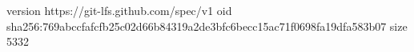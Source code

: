 version https://git-lfs.github.com/spec/v1
oid sha256:769abccfafcfb25c02d66b84319a2de3bfc6becc15ac71f0698fa19dfa583b07
size 5332

